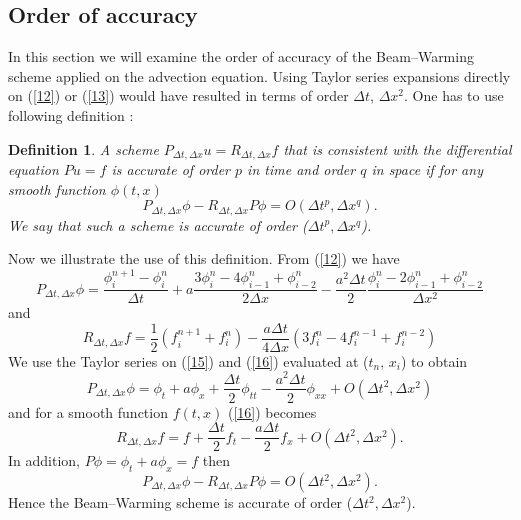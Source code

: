 \documentclass[a4paper, 10pt]{article}
\newtheorem{mydef}{Definition}
\begin{document}
\subsection{Order of accuracy}
In this section we will examine the order of accuracy of the Beam--Warming scheme applied on the advection equation. Using Taylor series expansions directly on (\ref{12}) or (\ref{13}) would have resulted in terms of order $\Delta t$, $\Delta x^2$. One has to use following definition \cite{strikwerda}:
\begin{mydef}
A scheme $ P_{\Delta t, \Delta x} u = R_{\Delta t, \Delta x} f $ that is consistent with the differential equation $ Pu = f $ is accurate of order $ p $ in time and order $ q $ in space if for any smooth function $ \phi(t, x) $
\begin{equation}
\label{14}
P_{\Delta t, \Delta x} \phi - R_{\Delta t, \Delta x} P \phi = O(\Delta t^p, \Delta x^q).
\end{equation}
We say that such a scheme is accurate of order ($\Delta t^p, \Delta x^q$).
\end{mydef}
Now we illustrate the use of this definition. From (\ref{12}) we have
\begin{equation}
\label{15}
P_{\Delta t, \Delta x} \phi = \frac{\phi_i^{n+1} - \phi_i^n}{\Delta t} + a\frac{3\phi_i^n - 4\phi_{i-1}^n + \phi_{i-2}^n}{2 \Delta x} - \frac{a^2 \Delta t}{2} \frac{\phi_{i}^n - 2\phi_{i-1}^n + \phi_{i-2}^n}{\Delta x^2}
\end{equation}
and
\begin{equation}
\label{16}
R_{\Delta t, \Delta x} f = \frac{1}{2} (f_i^{n+1} + f_i^n) - \frac{a \Delta t}{4 \Delta x} (3f_i^n - 4f_i^{n-1} + f_i^{n-2})
\end{equation}
We use the Taylor series on (\ref{15}) and (\ref{16}) evaluated at ($t_n,\, x_i$) to obtain
\begin{equation}
\label{17}
P_{\Delta t, \Delta x} \phi = \phi_t + a \phi_x + \frac{\Delta t}{2} \phi_{tt} - \frac{a^2 \Delta t}{2} \phi_{xx} + O(\Delta t^2, \Delta x^2)
\end{equation}
and for a smooth function $ f(t, x) $ (\ref{16}) becomes
\begin{equation}
\label{18}
R_{\Delta t, \Delta x} f = f + \frac{\Delta t}{2} f_{t} - \frac{a \Delta t}{2} f_x + O(\Delta t^2, \Delta x^2).
\end{equation}
In addition, $ P \phi = \phi_t + a \phi_x = f $ then
\begin{equation}
\label{19}
P_{\Delta t, \Delta x} \phi - R_{\Delta t, \Delta x} P \phi = O(\Delta t^2, \Delta x^2).
\end{equation}
Hence the Beam--Warming scheme is accurate of order ($\Delta t^2, \Delta x^2$).
\end{document}
